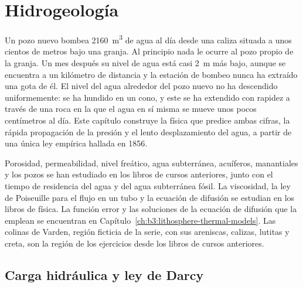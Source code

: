 \chapter{Hidrogeología}\label{ch:b3:hydrogeology}

Un pozo nuevo bombea \qty{2160}{m^3} de agua al día desde una caliza situada a unos
cientos de metros bajo una granja. Al principio nada le ocurre al pozo
propio de la granja. Un mes después su nivel de agua está casi \qty{2}{m} más bajo, aunque se encuentra
a un kilómetro de distancia y la estación de bombeo nunca ha extraído una gota de él. El
nivel del agua alrededor del pozo nuevo no ha descendido uniformemente: se ha hundido en un
cono, y este se ha extendido con rapidez a través de una roca en la que el agua
en sí misma se mueve unos pocos centímetros al día. Este capítulo construye la física que
predice ambas cifras, la rápida propagación de la presión y el lento
desplazamiento del agua, a partir de una única ley empírica hallada en 1856.

\begin{recall}
Porosidad, permeabilidad, nivel freático, agua subterránea, acuíferos, manantiales
y los pozos se han estudiado en los libros de cursos anteriores, junto con el tiempo de residencia del agua y
del agua subterránea fósil. La viscosidad, la ley de Poiseuille para el flujo en un tubo
y la ecuación de difusión se estudian en los libros de física. La función error
y las soluciones de la ecuación de difusión que la emplean se encuentran en
Capítulo~\ref{ch:b3:lithosphere-thermal-models}. Las colinas de Varden, región ficticia de la serie,
con sus areniscas, calizas, lutitas y creta, son la región de los ejercicios
desde los libros de cursos anteriores.
\end{recall}

\section{Carga hidráulica y ley de Darcy}\label{sec:b3:hydrogeology:darcy}

